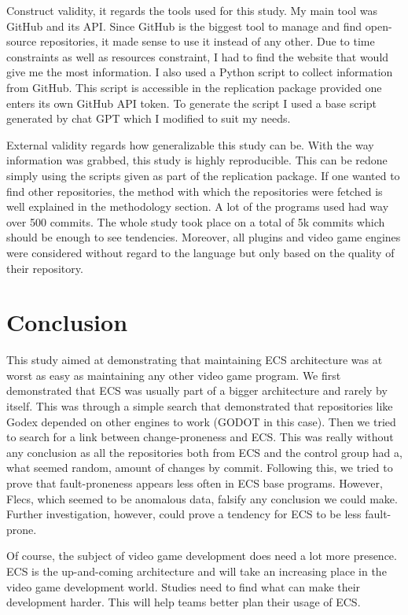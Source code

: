 \documentclass{IEEEcsmag}
\begin{document}
Construct validity, it regards the tools used for this study. My main tool was GitHub and its API. Since GitHub is the biggest tool to manage and find open-source repositories, it made sense to use it instead of any other. Due to time constraints as well as resources constraint, I had to find the website that would give me the most information. I also used a Python script to collect information from GitHub. This script is accessible in the replication package provided one enters its own GitHub API token. To generate the script I used a base script generated by chat GPT which I modified to suit my needs.

External validity regards how generalizable this study can be. With the way information was grabbed,  this study is highly reproducible. This can be redone simply using the scripts given as part of the replication package. If one wanted to find other repositories, the method with which the repositories were fetched is well explained in the methodology section. A lot of the programs used had way over 500 commits. The whole study took place on a total of 5k commits which should be enough to see tendencies. Moreover, all plugins and video game engines were considered without regard to the language but only based on the quality of their repository.

\section{Conclusion}

This study aimed at demonstrating that maintaining ECS architecture was at worst as easy as maintaining any other video game program. We first demonstrated that ECS was usually part of a bigger architecture and rarely by itself. This was through a simple search that demonstrated that repositories like Godex depended on other engines to work (GODOT in this case). Then we tried to search for a link between change-proneness and ECS. This was really without any conclusion as all the repositories both from ECS and the control group had a, what seemed random, amount of changes by commit.  Following this, we tried to prove that fault-proneness appears less often in ECS base programs. However, Flecs, which seemed to be anomalous data, falsify any conclusion we could make. Further investigation, however, could prove a tendency for ECS to be less fault-prone.

Of course, the subject of video game development does need a lot more presence. ECS is the up-and-coming architecture and will take an increasing place in the video game development world. Studies need to find what can make their development harder. This will help teams better plan their usage of ECS.
\end{document}
